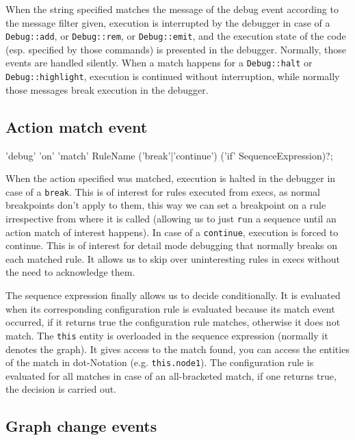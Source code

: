 When the string specified matches the message of the debug event according to the message filter given,
execution is interrupted by the debugger in case of a \texttt{Debug::add}, or \texttt{Debug::rem}, or \texttt{Debug::emit}, and the execution state of the code (esp. specified by those commands) is presented in the debugger.
Normally, those events are handled silently.
When a match happens for a \texttt{Debug::halt} or \texttt{Debug::highlight}, execution is continued without interruption, while normally those messages break execution in the debugger.

\subsection*{Action match event}

\begin{rail}
  'debug' 'on' 'match' RuleName ('break'|'continue') ('if' SequenceExpression)?;
\end{rail}

When the action specified was matched, execution is halted in the debugger in case of a \texttt{break}.
This is of interest for rules executed from execs, as normal breakpoints don't apply to them, this way we can set a breakpoint on a rule irrespective from where it is called 
(allowing us to just \texttt{r}un a sequence until an action match of interest happens).
In case of a \texttt{continue}, execution is forced to continue.
This is of interest for detail mode debugging that normally breaks on each matched rule.
It allows us to skip over uninteresting rules in execs without the need to acknowledge them.

The sequence expression finally allows us to decide conditionally.
It is evaluated when its corresponding configuration rule is evaluated because its match event occurred, if it returns true the configuration rule matches, otherwise it does not match.
The \texttt{this} entity is overloaded in the sequence expression (normally it denotes the graph).
It gives access to the match found, you can access the entities of the match in dot-Notation (e.g. \texttt{this.node1}).
The configuration rule is evaluated for all matches in case of an all-bracketed match, if one returns true, the decision is carried out.

\subsection*{Graph change events}

